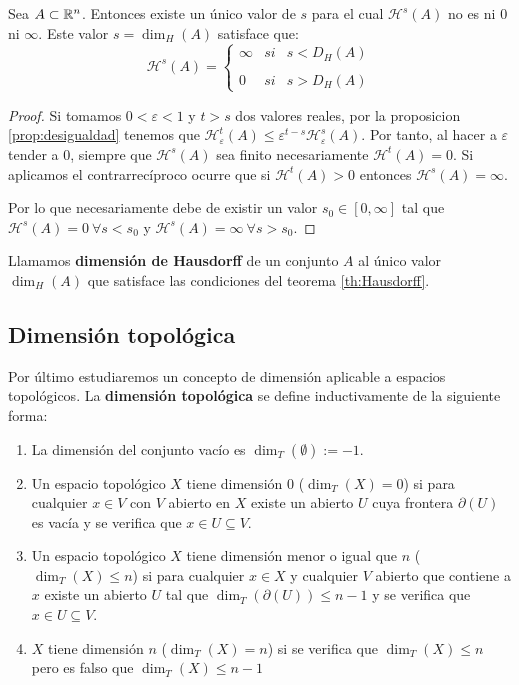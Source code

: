 \begin{teorema}
\label{th:Hausdorff}
Sea $A\subset \mathbb{R}^n$. Entonces existe un único valor de $s$ para el cual $\mathcal{H}^s(A)$ no es ni $0$ ni $\infty$. Este valor $s=\dim_H(A)$ satisface que:
\begin{equation}
\mathcal H^s(A)= \left\{ \begin{array}{lcc}
             \infty &   si  & s < D_H(A) \\
             \\ 0 &  si & s > D_H(A) 
             \end{array}
   \right.
\end{equation}
\end{teorema} 
\begin{proof}
  Si tomamos $0<\varepsilon<1$ y $t>s$ dos valores reales, por la proposicion \ref{prop:desigualdad} tenemos que $\mathcal{H}_\varepsilon^t(A)\leq \varepsilon^{t-s}\mathcal{H}_\varepsilon^s(A)$. Por tanto, al hacer a $\varepsilon$ tender a $0$, siempre que $\mathcal{H}^s(A)$ sea finito necesariamente $\mathcal{H}^t(A)=0$. Si aplicamos el contrarrecíproco ocurre que si $\mathcal{H}^t(A)>0$ entonces $\mathcal{H}^s(A)=\infty$.

  Por lo que necesariamente debe de existir un valor $s_0\in[0,\infty]$ tal que $\mathcal{H}^s(A)=0 \ \forall s<s_0$ y $\mathcal{H}^s(A)=\infty \ \forall s>s_0$.
\end{proof}
\begin{definicion}
Llamamos \textbf{dimensión de Hausdorff} de un conjunto $A$ al único valor $\dim_H(A)$ que satisface las condiciones del teorema \ref{th:Hausdorff}.
\end{definicion}

\subsection{Dimensión topológica}

Por último estudiaremos un concepto de dimensión aplicable a espacios topológicos. La \textbf{dimensión topológica} se define inductivamente de la siguiente forma:

\begin{enumerate}
\item La dimensión del conjunto vacío es $\dim_T(\emptyset):=-1$.
\item Un espacio topológico $X$ tiene dimensión 0 ($\dim_T(X)=0$) si para cualquier $x\in V$ con $V$ abierto en $X$ existe un abierto $U$ cuya frontera $\partial(U)$ es vacía y se verifica que $x\in U\subseteq V$.

\item Un espacio topológico $X$ tiene dimensión menor o igual que $n$ ($\dim_T(X)\leq n$) si para cualquier $x\in X$ y cualquier $V$ abierto que contiene a $x$ existe un abierto $U$ tal que $\dim_T(\partial(U))\leq n-1$ y se verifica que $x\in U\subseteq V$. 

\item $X$ tiene dimensión $n$ ($\dim_T(X)=n$) si se verifica que $\dim_T(X)\leq n$ pero es falso que $\dim_T(X)\leq n-1$
\end{enumerate}

